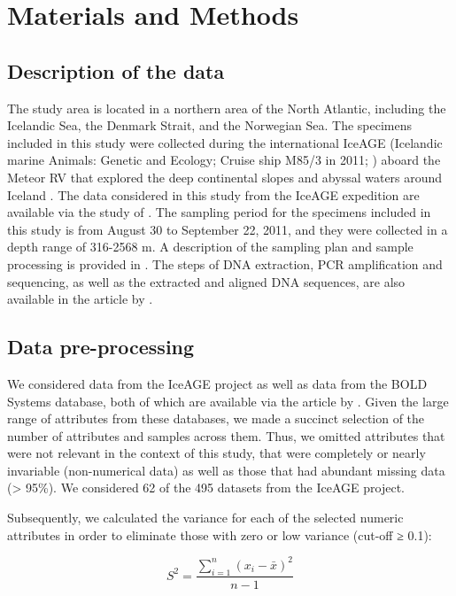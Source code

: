 \section{Materials and Methods}\label{materials-methods}

\subsection{Description of the data}
The study area is located in a northern area of the North Atlantic, including the Icelandic Sea, the Denmark Strait, and the Norwegian Sea. The specimens included in this study were collected during the international IceAGE (Icelandic marine Animals: Genetic and Ecology; Cruise ship M85/3 in 2011; \citep{brix_iceage_2014, meisner_prefacebiodiversity_2018}) aboard the Meteor RV that explored the deep continental slopes and abyssal waters around Iceland \citep{meisner_prefacebiodiversity_2018}. The data considered in this study from the IceAGE expedition are available via the study of \cite{uhlir_adding_2021}. The sampling period for the specimens included in this study is from August 30 to September 22, 2011, and they were collected in a depth range of 316-2568 m. A description of the sampling plan and sample processing is provided in \cite{uhlir_adding_2021}. The steps of DNA extraction, PCR amplification and sequencing, as well as the extracted and aligned DNA sequences, are also available in the article by \cite{uhlir_adding_2021}.

\subsection{Data pre-processing}
We considered data from the IceAGE project as well as data from the BOLD Systems database, both of which are available via the article by \cite{uhlir_adding_2021}. Given the large range of attributes from these databases, we made a succinct selection of the number of attributes and samples across them. Thus, we omitted attributes that were not relevant in the context of this study, that were completely or nearly invariable (non-numerical data) as well as those that had abundant missing data (> 95\%). We considered 62 of the 495 datasets from the IceAGE project.

Subsequently, we calculated the variance for each of the selected numeric attributes in order to eliminate those with zero or low variance (cut-off ≥ 0.1):

\begin{equation}
S^2 = \frac{\sum_{i=1}^{n} (x_i - \bar{x})^2}{n-1}
\end{equation}

